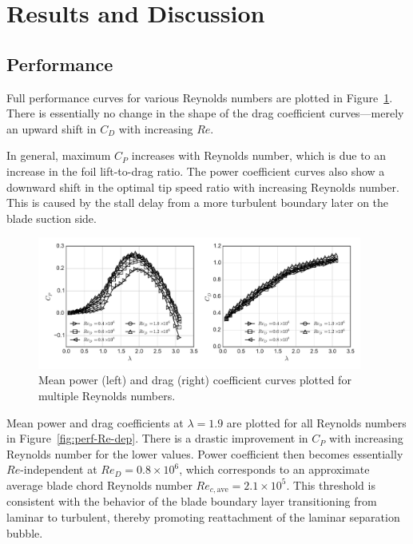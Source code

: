 \documentclass[energies,article,accept,moreauthors,pdftex,12pt,a4paper]{mdpi}
\begin{document}
\section{Results and Discussion}


\subsection{Performance}

Full performance curves for various Reynolds numbers are plotted in
Figure~\ref{fig:perf-curves}. There is essentially no change in the shape of the
drag coefficient curves---merely an upward shift in $C_D$ with increasing $Re$.

In general, maximum $C_P$ increases with Reynolds number, which is due to an
increase in the foil lift-to-drag ratio. The power coefficient curves also show
a downward shift in the optimal tip speed ratio with increasing Reynolds number.
This is caused by the stall delay from a more turbulent boundary later on the
blade suction side.

\begin{figure}[ht]
\centering
\includegraphics[width=0.95\textwidth]{figures/perf_curves}
\caption{Mean power (left) and drag (right) coefficient curves plotted for
multiple Reynolds numbers.}
\label{fig:perf-curves}
\end{figure}

Mean power and drag coefficients at $\lambda=1.9$ are plotted for all Reynolds
numbers in Figure~\ref{fig:perf-Re-dep}. There is a drastic improvement in $C_P$
with increasing Reynolds number for the lower values. Power coefficient then
becomes  essentially $Re$-independent at $Re_D = 0.8 \times 10^6$, which
corresponds to an approximate average blade chord Reynolds number $Re_{c,
\mathrm{ave}} = 2.1 \times 10^5$. This threshold is consistent with the behavior
of the blade boundary layer transitioning from laminar to turbulent, thereby
promoting reattachment of the laminar separation bubble.
\end{document}
